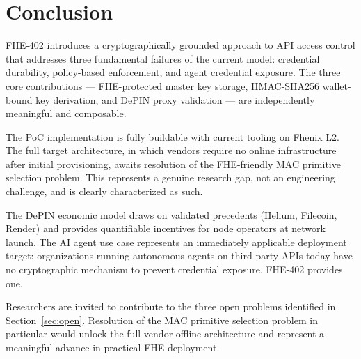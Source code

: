 \documentclass[conference]{IEEEtran}
\begin{document}
\section{Conclusion}
\label{sec:conclusion}

FHE-402 introduces a cryptographically grounded approach to API access control that
addresses three fundamental failures of the current model: credential durability, policy-based
enforcement, and agent credential exposure. The three core contributions --- FHE-protected
master key storage, HMAC-SHA256 wallet-bound key derivation, and DePIN proxy validation ---
are independently meaningful and composable.

The PoC implementation is fully buildable with current tooling on Fhenix L2. The full
target architecture, in which vendors require no online infrastructure after initial
provisioning, awaits resolution of the FHE-friendly MAC primitive selection problem.
This represents a genuine research gap, not an engineering challenge, and is clearly
characterized as such.

The DePIN economic model draws on validated precedents (Helium, Filecoin, Render) and
provides quantifiable incentives for node operators at network launch. The AI agent use
case represents an immediately applicable deployment target: organizations running
autonomous agents on third-party APIs today have no cryptographic mechanism to prevent
credential exposure. FHE-402 provides one.

Researchers are invited to contribute to the three open problems identified in
Section~\ref{sec:open}. Resolution of the MAC primitive selection problem in particular
would unlock the full vendor-offline architecture and represent a meaningful advance in
practical FHE deployment.
\end{document}
